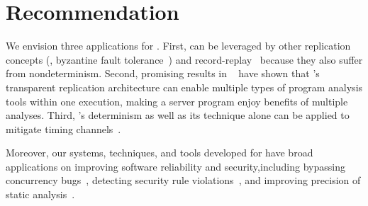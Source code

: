 

\section{Recommendation} \label{sec:recommendation}
We envision three applications for \xxx. First, \xxx can 
be leveraged by other replication concepts (\eg, byzantine fault 
tolerance~\cite{pbft:osdi99, zyzzyva:sosp07}) 
and record-replay~\cite{scribe:sigmetrics10, racepro:sosp11, respec:asplos10} 
because they also suffer from nondeterminism. Second, promising 
results in \repframe~\cite{repframe:apsys15} have shown that \xxx's transparent 
replication architecture can enable multiple types of program analysis tools 
within one execution, making a server program enjoy benefits of multiple 
analyses. Third, \xxx's determinism as well as its \timealgo technique alone 
can be applied to mitigate timing channels~\cite{Askarov:ccs10, Zhang:ccs11, 
Aviram:ccsw10}.

Moreover, our systems, techniques, and tools developed 
for \xxx have broad applications on improving software reliability and 
security,including bypassing concurrency bugs~\cite{wu:loom:osdi10}, detecting 
security rule violations~\cite{woodpecker:asplos13}, and improving precision of 
static analysis~\cite{wu:pldi12}. 
